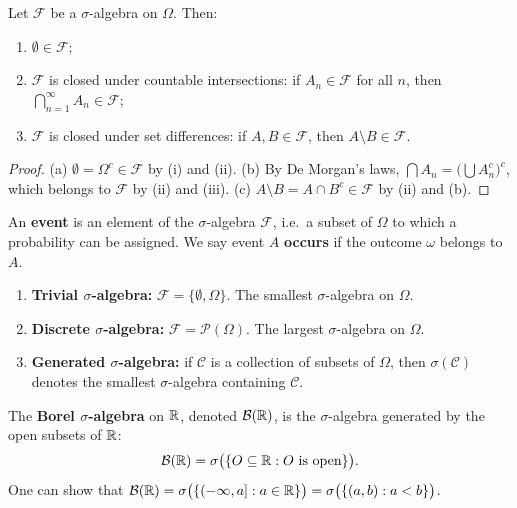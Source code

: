 \begin{proposition}
Let $\mathcal{F}$ be a $\sigma$-algebra on $\Omega$. Then:
\begin{enumerate}[label=(\alph*)]
    \item $\emptyset \in \mathcal{F}$;
    \item $\mathcal{F}$ is closed under countable intersections:
          if $A_n \in \mathcal{F}$ for all $n$, then
          $\bigcap_{n=1}^{\infty} A_n \in \mathcal{F}$;
    \item $\mathcal{F}$ is closed under set differences: if $A, B \in \mathcal{F}$,
          then $A \setminus B \in \mathcal{F}$.
\end{enumerate}
\end{proposition}

\begin{proof}
(a) $\emptyset = \Omega^c \in \mathcal{F}$ by (i) and (ii).
(b) By De Morgan's laws, $\bigcap A_n = \bigl(\bigcup A_n^c\bigr)^c$,
which belongs to $\mathcal{F}$ by (ii) and (iii).
(c) $A \setminus B = A \cap B^c \in \mathcal{F}$ by (ii) and (b).
\end{proof}

\begin{definition}[Event]
An \textbf{event} is an element of the $\sigma$-algebra $\mathcal{F}$, i.e.\ a
subset of $\Omega$ to which a probability can be assigned. We say event $A$
\textbf{occurs} if the outcome $\omega$ belongs to $A$.
\end{definition}

\begin{example}
\begin{enumerate}
    \item \textbf{Trivial $\sigma$-algebra:} $\mathcal{F} = \{\emptyset, \Omega\}$.
          The smallest $\sigma$-algebra on $\Omega$.
    \item \textbf{Discrete $\sigma$-algebra:} $\mathcal{F} = \mathcal{P}(\Omega)$.
          The largest $\sigma$-algebra on $\Omega$.
    \item \textbf{Generated $\sigma$-algebra:} if $\mathcal{C}$ is a collection of
          subsets of $\Omega$, then $\sigma(\mathcal{C})$ denotes the smallest
          $\sigma$-algebra containing $\mathcal{C}$.
\end{enumerate}
\end{example}

\begin{definition}
The \textbf{Borel $\sigma$-algebra} on $\mathbb{R}$, denoted $\mathcal{B}(\mathbb{R})$, is the
$\sigma$-algebra generated by the open subsets of $\mathbb{R}$:
\[
    \mathcal{B}(\mathbb{R}) = \sigma\bigl(\{O \subseteq \mathbb{R} : O \text{ is open}\}\bigr).
\]
One can show that $\mathcal{B}(\mathbb{R}) = \sigma\bigl(\{(-\infty, a] : a \in \mathbb{R}\}\bigr)
= \sigma\bigl(\{(a, b) : a < b\}\bigr)$.
\end{definition}

